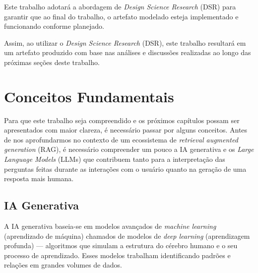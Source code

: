 \documentclass[a4paper, 12pt]{article}
\newcommand{\citeb}[1]{\bibleftbracket\cite{#1}\bibrightbracket}
\begin{document}
    Este trabalho adotará a abordagem de \textit{Design Science Research} (DSR) para garantir que ao final do trabalho, o artefato modelado esteja implementado e funcionando conforme planejado.


    Assim, ao utilizar o \textit{Design Science Research} (DSR), este trabalho resultará em um artefato produzido com base nas análises e discussões realizadas ao longo das próximas seções deste trabalho.
    
    \clearpage

    \section{Conceitos Fundamentais} \label{sec:concepts}

    Para que este trabalho seja compreendido e os próximos capítulos possam ser apresentados com maior clareza, é necessário passar por alguns conceitos. Antes de nos aprofundarmos no contexto de um ecossistema de \textit{retrieval augmented generation} (RAG), é necessário compreender um pouco a IA generativa e os \textit{Large Language Models} (LLMs) que contribuem tanto para a interpretação das perguntas feitas durante as interações com o usuário quanto na geração de uma resposta mais humana.
    
    \subsection{IA Generativa}
    

    A IA generativa baseia-se em modelos avançados de \textit{machine learning} (aprendizado de máquina) chamados de modelos de \textit{deep learning} (aprendizagem profunda) — algoritmos que simulam a estrutura do cérebro humano e o seu processo de aprendizado. Esses modelos trabalham identificando padrões e relações em grandes volumes de dados.
\end{document}
